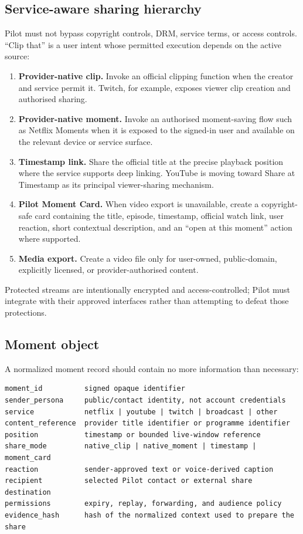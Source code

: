 \documentclass[11pt,a4paper]{article}
\begin{document}
\subsection{Service-aware sharing hierarchy}

Pilot must not bypass copyright controls, DRM, service terms, or access
controls.  ``Clip that'' is a user intent whose permitted execution depends on
the active source:

\begin{enumerate}[leftmargin=*]
  \item \textbf{Provider-native clip.} Invoke an official clipping function
        when the creator and service permit it.  Twitch, for example, exposes
        viewer clip creation and authorised sharing.\cite{twitchclips}
  \item \textbf{Provider-native moment.} Invoke an authorised moment-saving
        flow such as Netflix Moments when it is exposed to the signed-in user
        and available on the relevant device or service surface.\cite{netflixmoments}
  \item \textbf{Timestamp link.} Share the official title at the precise
        playback position where the service supports deep linking.  YouTube is
        moving toward Share at Timestamp as its principal viewer-sharing
        mechanism.\cite{youtubetimestamp}
  \item \textbf{Pilot Moment Card.} When video export is unavailable, create a
        copyright-safe card containing the title, episode, timestamp, official
        watch link, user reaction, short contextual description, and an
        ``open at this moment'' action where supported.
  \item \textbf{Media export.} Create a video file only for user-owned,
        public-domain, explicitly licensed, or provider-authorised content.
\end{enumerate}

Protected streams are intentionally encrypted and access-controlled; Pilot
must integrate with their approved interfaces rather than attempting to
defeat those protections.\cite{fairplay}

\subsection{Moment object}

A normalized moment record should contain no more information than necessary:

\begin{verbatim}
moment_id          signed opaque identifier
sender_persona     public/contact identity, not account credentials
service            netflix | youtube | twitch | broadcast | other
content_reference  provider title identifier or programme identifier
position           timestamp or bounded live-window reference
share_mode         native_clip | native_moment | timestamp | moment_card
reaction           sender-approved text or voice-derived caption
recipient          selected Pilot contact or external share destination
permissions        expiry, replay, forwarding, and audience policy
evidence_hash      hash of the normalized context used to prepare the share
\end{verbatim}
\end{document}
